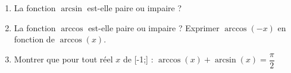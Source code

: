 
\begin{exercice}\label{exoautoanalyseCTU-7}


\begin{enumerate}
\item La fonction $\arcsin$ est-elle paire ou impaire ? 
\item La fonction $\arccos$ est-elle paire ou impaire ? Exprimer $\arccos(-x)$ en fonction de $\arccos(x)$. 
 \item Montrer que pour tout réel $x$ de [-1\;;] :  $\arccos(x) + \arcsin (x) = \dfrac{ \pi}{2}$ 
\end{enumerate}









\end{exercice}
